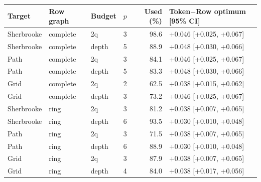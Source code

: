 \begin{tabular}{lllrrl}
\toprule
Target & Row graph & Budget & $p$ & Used (\%) & Token$-$Row optimum [95\% CI]\\
\midrule
Sherbrooke & complete & 2q & 3 & 98.6 & +0.046 [+0.025, +0.067]\\
Sherbrooke & complete & depth & 5 & 88.9 & +0.048 [+0.030, +0.066]\\
Path & complete & 2q & 3 & 84.1 & +0.046 [+0.025, +0.067]\\
Path & complete & depth & 5 & 83.3 & +0.048 [+0.030, +0.066]\\
Grid & complete & 2q & 2 & 62.5 & +0.038 [+0.015, +0.062]\\
Grid & complete & depth & 3 & 73.2 & +0.046 [+0.025, +0.067]\\
Sherbrooke & ring & 2q & 3 & 81.2 & +0.038 [+0.007, +0.065]\\
Sherbrooke & ring & depth & 6 & 93.5 & +0.030 [+0.010, +0.048]\\
Path & ring & 2q & 3 & 71.5 & +0.038 [+0.007, +0.065]\\
Path & ring & depth & 6 & 88.9 & +0.030 [+0.010, +0.048]\\
Grid & ring & 2q & 3 & 87.9 & +0.038 [+0.007, +0.065]\\
Grid & ring & depth & 4 & 84.0 & +0.038 [+0.017, +0.056]\\
\bottomrule
\end{tabular}
